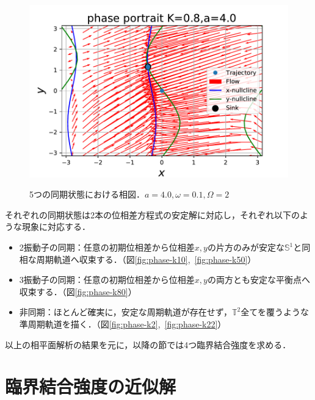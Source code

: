 \documentclass[../main]{subfiles}
\begin{document}
\begin{figure}[t]
    \begin{minipage}[b]{0.47\linewidth}
      \centering
      \includegraphics[keepaspectratio, scale=0.42]{images/phase_a4K80.pdf}
      \label{fig:phase-k80}
    \end{minipage}
    \caption{5つの同期状態における相図．$a=4.0,\omega=0.1,\Omega=2$}\label{fig:phase}
\end{figure}

それぞれの同期状態は2本の位相差方程式の安定解に対応し，それぞれ以下のような現象に対応する．
\begin{itemize}
    \item 
    2振動子の同期：任意の初期位相差から位相差$x,y$の片方のみが安定な$\mathbb{S}^1$と同相な周期軌道へ収束する．（図\ref{fig:phase-k10},\ \ref{fig:phase-k50}）
    \item
    3振動子の同期：任意の初期位相差から位相差$x,y$の両方とも安定な平衡点へ収束する．（図\ref{fig:phase-k80}）
    \item
    非同期：ほとんど確実に，安定な周期軌道が存在せず，$\mathbb{T}^2$全てを覆うような準周期軌道を描く．（図\ref{fig:phase-k2},\ \ref{fig:phase-k22}）
\end{itemize}
以上の相平面解析の結果を元に，以降の節では4つ臨界結合強度を求める．
\section{臨界結合強度の近似解}
\label{sec:3body-critical}
\end{document}
